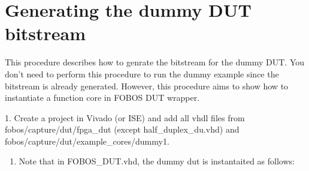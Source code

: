 \documentclass[letterpaper,10pt,english]{sphinxmanual}
\begin{document}
\begin{sphinxVerbatim}[commandchars=\\\{\}]
      
          
              
         
     
            
                       
                 

            

 
\end{sphinxVerbatim}


\section{Generating the dummy DUT bitstream}
\label{\detokenize{dutdev:generating-the-dummy-dut-bitstream}}
This procedure describes how to genrate the bitstream for the dummy DUT. You don’t need to perform
this procedure to run the dummy example since the bitstream is already generated.
However, this procedure aims to show how to instantiate a function core in FOBOS DUT wrapper.

1. Create a project in Vivado (or ISE) and add all vhdl files from fobos/capture/dut/fpga\_dut (except half\_duplex\_du.vhd)
and fobos/capture/dut/example\_cores/dummy1.
\begin{enumerate}
%
\setcounter{enumi}{1}
\item {} 
Note that in FOBOS\_DUT.vhd, the dummy dut is instantaited as follows:

\end{enumerate}
\end{document}
